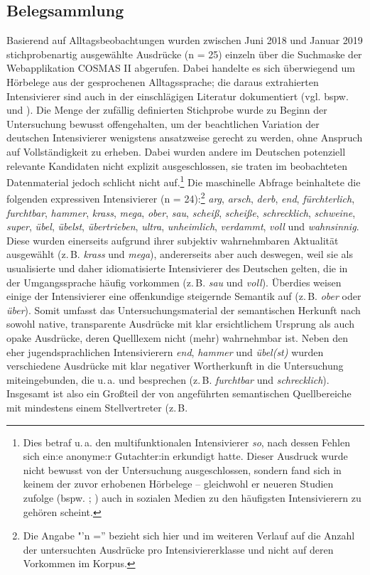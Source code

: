 \subsection{Belegsammlung}
Basierend auf Alltagsbeobachtungen wurden zwischen Juni 2018 und Januar 2019 stichprobenartig ausgewählte Ausdrücke (n = 25) einzeln über die Suchmaske der Webapplikation COSMAS II abgerufen. Dabei handelte es sich überwiegend um Hörbelege aus der gesprochenen Alltagssprache; die daraus extrahierten Intensivierer sind auch in der einschlägigen Literatur dokumentiert (vgl. bspw. \citealt[]{Biedermann.1969} und \citealt[]{Os.1989}). Die Menge der zufällig definierten Stichprobe wurde zu Beginn der Untersuchung bewusst offengehalten, um der beachtlichen Variation der deutschen Intensivierer wenigstens ansatzweise gerecht zu werden, ohne Anspruch auf Vollständigkeit zu erheben. Dabei wurden andere im Deutschen potenziell relevante Kandidaten nicht explizit ausgeschlossen, sie traten im beobachteten Datenmaterial jedoch schlicht nicht auf.\footnote{Dies betraf u.\,a. den multifunktionalen Intensivierer \textit{so}, nach dessen Fehlen sich ein:e anonyme:r Gutachter:in erkundigt hatte. Dieser Ausdruck wurde nicht bewusst von der Untersuchung ausgeschlossen, sondern fand sich in keinem der zuvor erhobenen Hörbelege -- gleichwohl er neueren Studien zufolge (bspw. \citealt[]{Stratton.2020b}; \citealt[]{Scheffler.2023}) auch in sozialen Medien zu den häufigsten Intensivierern zu gehören scheint.} Die maschinelle Abfrage beinhaltete die folgenden expressiven Intensivierer (n = 24):\footnote{Die Angabe "'n ='' bezieht sich hier und im weiteren Verlauf auf die Anzahl der untersuchten Ausdrücke pro Intensiviererklasse und nicht auf deren Vorkommen im Korpus.} \textit{arg}, \textit{arsch}, \textit{derb}, \textit{end}, \textit{fürchterlich}, \textit{furchtbar}, \textit{hammer}, \textit{krass}, \textit{mega}, \textit{ober}, \textit{sau}, \textit{scheiß}, \textit{scheiße}, \textit{schrecklich}, \textit{schweine}, \textit{super}, \textit{übel}, \textit{übelst}, \textit{übertrieben}, \textit{ultra}, \textit{unheimlich}, \textit{verdammt}, \textit{voll} und \textit{wahnsinnig}. Diese wurden einerseits aufgrund ihrer subjektiv wahrnehmbaren Aktualität ausgewählt (z.\,B. \textit{krass} und \textit{mega}), andererseits aber auch deswegen, weil sie als usualisierte und daher idiomatisierte Intensivierer des Deutschen gelten, die in der Umgangssprache häufig vorkommen (z.\,B. \textit{sau} und \textit{voll}). Überdies weisen einige der Intensivierer eine offenkundige steigernde Semantik auf (z.\,B. \textit{ober} oder \textit{über}). Somit umfasst das Untersuchungsmaterial der semantischen Herkunft nach sowohl native, transparente Ausdrücke mit klar ersichtlichem Ursprung als auch opake Ausdrücke, deren Quelllexem nicht (mehr) wahrnehmbar ist. Neben den eher jugendsprachlichen Intensivierern \textit{end}, \textit{hammer} und \textit{übel(st)} wurden verschiedene Ausdrücke mit klar negativer Wortherkunft in die Untersuchung miteingebunden, die u.\,a. \citet[165ff.]{Biedermann.1969} und \citet[]{Hentschel.1998b} besprechen (z.\,B. \textit{furchtbar} und \textit{schrecklich}). Insgesamt ist also ein Großteil der von \citet[]{Claudi.2006} angeführten semantischen Quellbereiche mit mindestens einem Stellvertreter (z.\,B. 